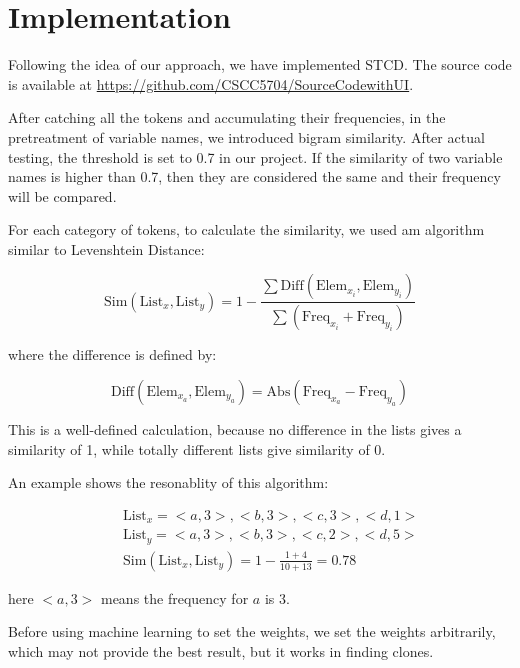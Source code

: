 \documentclass[../main.tex]{subfiles}
\begin{document}
\section{Implementation}

Following the idea of our approach, we have implemented STCD. The source code is available at {\color{blue} \url{https://github.com/CSCC5704/SourceCodewithUI}}.

After catching all the tokens and accumulating their frequencies, in the pretreatment of variable names, we introduced bigram similarity. After actual testing, the threshold is set to 0.7 in our project. If the similarity of two variable names is higher than 0.7, then they are considered the same and their frequency will be compared.

For each category of tokens, to calculate the similarity, we used am algorithm similar to Levenshtein Distance:

\begin{equation}
\text{Sim}(\text{List}_x, \text{List}_y) = 1 - \frac{\sum \text{Diff}(\text{Elem}_{x_i}, \text{Elem}_{y_i})} {\sum (\text{Freq}_{x_i} + \text{Freq}_{y_i} )}
\end{equation}

where the difference is defined by:

\begin{equation}
\text{Diff}(\text{Elem}_{x_a}, \text{Elem}_{y_a}) = \text{Abs}(\text{Freq}_{x_a} - \text{Freq}_{y_a})
\end{equation}

This is a well-defined calculation, because no difference in the lists gives a similarity of 1, while totally different lists give similarity of 0.

An example shows the resonablity of this algorithm:

\begin{eqnarray}\nonumber
&&\text{List}_x = {<a, 3>, <b, 3>, <c, 3>, <d, 1>}\\ \nonumber
&&\text{List}_y = {<a, 3>, <b, 3>, <c, 2>, <d, 5>} \\ 
&&\text{Sim}(\text{List}_x, \text{List}_y) = 1 - \frac{1 + 4}{10 + 13} = 0.78
\end{eqnarray}

here $<a, 3>$ means the frequency for $a$ is 3.

Before using machine learning to set the weights, we set the weights arbitrarily, which may not provide the best result, but it works in finding clones. 
\end{document}
